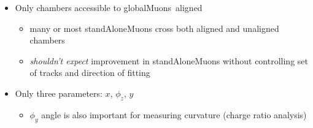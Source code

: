 \documentclass[compress]{beamer}
\begin{document}
\begin{frame}
\begin{columns}
\begin{itemize}
\item Only chambers accessible to \mbox{globalMuons aligned\hspace{-1 cm}}
\begin{itemize}
\item \scriptsize many or most standAloneMuons cross both aligned and unaligned chambers
\item \scriptsize {\it shouldn't expect} improvement in standAloneMuons without controlling set of tracks and direction of fitting
\end{itemize}

\item Only three parameters: $x$, $\phi_z$, $y$
\begin{itemize}
\item \scriptsize $\phi_y$ angle is also important for measuring curvature (charge ratio analysis)
\end{itemize}
\end{itemize}
\end{columns}
\end{frame}
\end{document}
